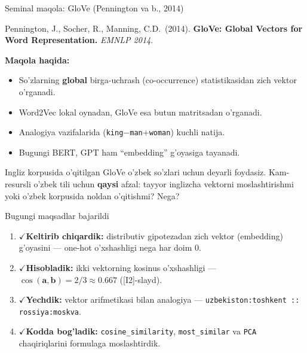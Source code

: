 \documentclass[aspectratio=169,11pt]{beamer}
\newcommand{\bajarildi}{{\color{deepgreen}\large$\checkmark$}\;}
\begin{document}
\begin{frame}{Seminal maqola: GloVe (Pennington va b., 2014)}
  \begin{tcolorbox}[defbox,title=Seminal maqola]
    \small
    Pennington, J., Socher, R., Manning, C.D.\ (2014).
    \textbf{GloVe: Global Vectors for Word Representation.}
    \textit{EMNLP 2014}.
  \end{tcolorbox}
  \vspace{5pt}
  \textbf{Maqola haqida:}
  \begin{itemize}\small\setlength\itemsep{3pt}
    \item So'zlarning \textbf{global} birga-uchrash (co-occurrence)
          statistikasidan zich vektor o'rganadi.
    \item Word2Vec lokal oynadan, GloVe esa butun matritsadan o'rganadi.
    \item Analogiya vazifalarida (\texttt{king$-$man$+$woman}) kuchli natija.
    \item Bugungi BERT, GPT ham ``embedding'' g'oyasiga tayanadi.
  \end{itemize}
  \vspace{5pt}
  \begin{tcolorbox}[warnbox,title=Muhokama savoli (P3 gacha o'ylang)]
    \small
    Ingliz korpusida o'qitilgan GloVe o'zbek so'zlari uchun deyarli
    foydasiz. Kam-resursli o'zbek tili uchun \textbf{qaysi} afzal:
    tayyor inglizcha vektorni moslashtirishmi yoki o'zbek korpusida
    noldan o'qitishmi? Nega?
  \end{tcolorbox}
\end{frame}

\begin{frame}{Bugungi maqsadlar bajarildi}
  \begin{enumerate}\setlength\itemsep{9pt}
    \item \bajarildi \textbf{Keltirib chiqardik:}
          distributiv gipotezadan zich vektor (embedding) g'oyasini ---
          one-hot o'xshashligi nega har doim $0$.
    \item \bajarildi \textbf{Hisobladik:}
          ikki vektorning kosinus o'xshashligi ---
          $\cos(\mathbf{a},\mathbf{b}) = 2/3 \approx 0.667$ ([I2]-slayd).
    \item \bajarildi \textbf{Yechdik:}
          vektor arifmetikasi bilan analogiya ---
          \texttt{uzbekiston:toshkent :: rossiya:moskva}.
    \item \bajarildi \textbf{Kodda bog'ladik:}
          \texttt{cosine\_similarity}, \texttt{most\_similar} va
          \texttt{PCA} chaqiriqlarini formulaga moslashtirdik.
  \end{enumerate}
\end{frame}
\end{document}
